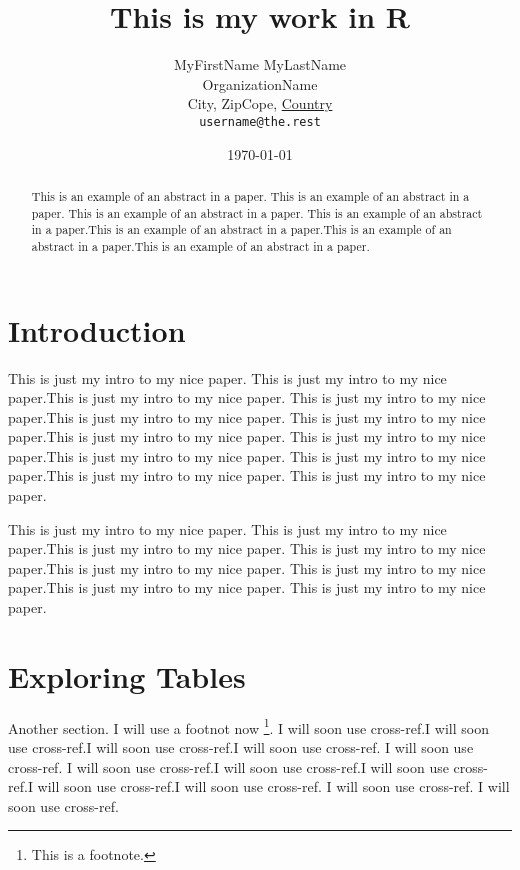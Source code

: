 \documentclass[a4paper, 12pt]{article}
\title{This is my work in R}
\author{
        MyFirstName MyLastName\\
        OrganizationName\\
        City, ZipCope, \underline{Country}\\
        \texttt{username@the.rest}
}
\date{\today}  %
\begin{document}

\maketitle 

\begin{abstract}
This is an example of an abstract in a paper. This is an example of an abstract in a paper. This is an example of an abstract in a paper. This is an example of an abstract in a paper.This is an example of an abstract in a paper.This is an example of an abstract in a paper.This is an example of an abstract in a paper.

\end{abstract}



\section*{Introduction} %

This is just my intro to my nice paper. This is just my intro to my nice paper.This is just my intro to my nice paper. This is just my intro to my nice paper.This is just my intro to my nice paper. This is just my intro to my nice paper.This is just my intro to my nice paper. This is just my intro to my nice paper.This is just my intro to my nice paper. This is just my intro to my nice paper.This is just my intro to my nice paper. This is just my intro to my nice paper.

This is just my intro to my nice paper. This is just my intro to my nice paper.This is just my intro to my nice paper. This is just my intro to my nice paper.This is just my intro to my nice paper. This is just my intro to my nice paper.This is just my intro to my nice paper. This is just my intro to my nice paper.


\section{Exploring Tables}\label{explo-tables} %

Another section. I will use a footnot now \footnote{This is a footnote.}. I will soon use cross-ref.I will soon use cross-ref.I will soon use cross-ref.I will soon use cross-ref. I will soon use cross-ref. I will soon use cross-ref.I will soon use cross-ref.I will soon use cross-ref.I will soon use cross-ref.I will soon use cross-ref. I will soon use cross-ref. I will soon use cross-ref.
\end{document}
